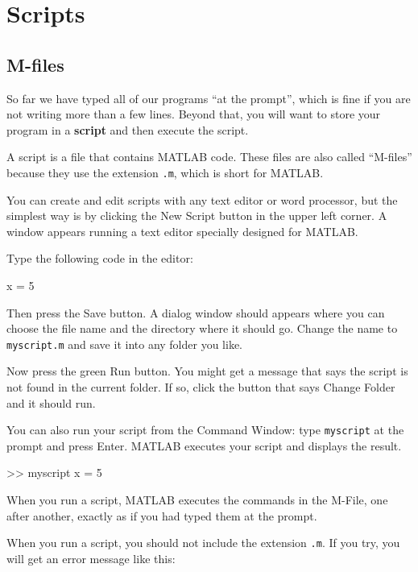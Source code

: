 \documentclass[
]{book}
\numberwithin{Answer}{chapter}
\numberwithin{Exercise}{chapter}
\begin{document}
\chapter{Scripts}

\section{M-files}
\label{sect:M-files}

So far we have typed all of our programs ``at the prompt'', which is
fine if you are not writing more than a few lines.  Beyond that,
you will want to store your program in a {\bf script} and then
execute the script.

A script is a file that contains MATLAB code.  These files are
also called ``M-files'' because they use the extension {\tt .m},
which is short for MATLAB.

You can create and edit scripts with any text editor or word processor, but the simplest way is by clicking the {\sf New Script} button in the upper left corner.  A window appears running a text editor specially designed for MATLAB.

Type the following code in the editor:

\begin{code}
x = 5
\end{code}

Then press the {\sf Save} button.  A dialog window should appears where you
can choose the file name and the directory where it should go.  Change
the name to {\tt myscript.m} and save it into any folder you like.

Now press the green {\sf Run} button.  You might get a message that says the script is not found in the current folder.  
If so, click the button that says {\sf Change Folder} and it should run.

You can also run your script from the Command Window: type {\tt myscript} at the prompt and press Enter.  
MATLAB executes your script and displays the result.

\begin{code}
>> myscript
x = 5
\end{code}

When you run a script, MATLAB executes the commands in the M-File, one
after another, exactly as if you had typed them at the prompt.

When you run a script, you should not include the extension {\tt .m}.  If you try, you will get an error message like this:
\end{document}
